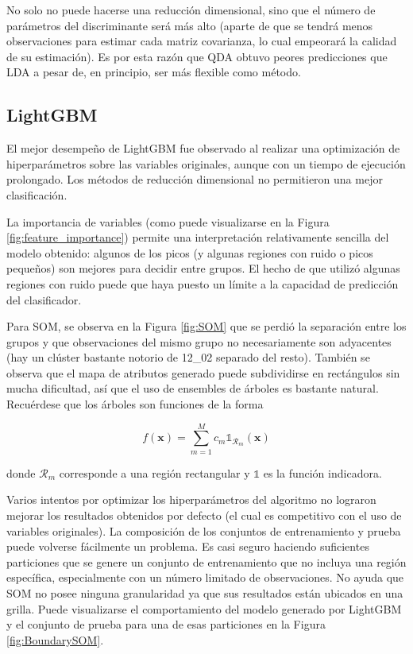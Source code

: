 \documentclass[12pt]{article}
\begin{document}
No solo no puede hacerse una reducción dimensional, sino que el número de parámetros del discriminante será más alto (aparte de que se tendrá menos observaciones para estimar cada matriz covarianza, lo cual empeorará la calidad de su estimación). Es por esta razón que QDA obtuvo peores predicciones que LDA a pesar de, en principio, ser más flexible como método.

\subsection{LightGBM}

El mejor desempeño de LightGBM fue observado al realizar una optimización de hiperparámetros sobre las variables originales, aunque con un tiempo de ejecución prolongado. Los métodos de reducción dimensional no permitieron una mejor clasificación.

La importancia de variables (como puede visualizarse en la Figura \ref{fig:feature_importance}) permite una interpretación relativamente sencilla del modelo obtenido: algunos de los picos (y algunas regiones con ruido o picos pequeños) son mejores para decidir entre grupos. El hecho de que utilizó algunas regiones con ruido puede que haya puesto un límite a la capacidad de predicción del clasificador.


Para SOM, se observa en la Figura \ref{fig:SOM} que se perdió la separación entre los grupos y que observaciones del mismo grupo no necesariamente son adyacentes (hay un clúster bastante notorio de 12\_02 separado del resto). También se observa que el mapa de atributos generado puede subdividirse en rectángulos sin mucha dificultad, así que el uso de ensembles de árboles es bastante natural. Recuérdese que los árboles son funciones de la forma 

\begin{equation}
f(\mathbf{x}) = \sum_{m = 1}^M c_m \mathds{1}_{\mathcal{R}_m}(\mathbf{x})    
\end{equation} 

donde $\mathcal{R}_m$ corresponde a una región rectangular y $\mathds{1}$ es la función indicadora.

Varios intentos por optimizar los hiperparámetros del algoritmo no lograron mejorar los resultados obtenidos por defecto (el cual es competitivo con el uso de variables originales). La composición de los conjuntos de entrenamiento y prueba puede volverse fácilmente un problema. Es casi seguro haciendo suficientes particiones que se genere un conjunto de entrenamiento que no incluya una región específica, especialmente con un número limitado de observaciones. No ayuda que SOM no posee ninguna granularidad ya que sus resultados están ubicados en una grilla. Puede visualizarse el comportamiento del modelo generado por LightGBM y el conjunto de prueba para una de esas particiones en la Figura \ref{fig:BoundarySOM}.
\end{document}
